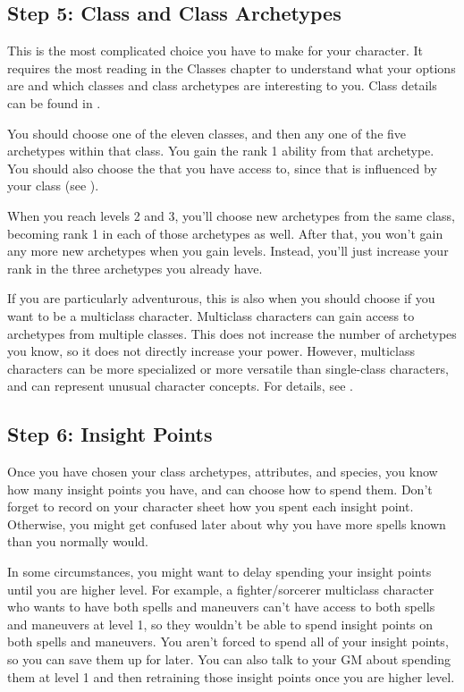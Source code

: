     \subsection{Step 5: Class and Class Archetypes}
        This is the most complicated choice you have to make for your character.
        It requires the most reading in the Classes chapter to understand what your options are and which classes and class archetypes are interesting to you.
        Class details can be found in .

        You should choose one of the eleven classes, and then any one of the five archetypes within that class.
        You gain the rank 1 ability from that archetype.
        You should also choose the  that you have access to, since that is influenced by your class (see ).

        When you reach levels 2 and 3, you'll choose new archetypes from the same class, becoming rank 1 in each of those archetypes as well.
        After that, you won't gain any more new archetypes when you gain levels.
        Instead, you'll just increase your rank in the three archetypes you already have.

        If you are particularly adventurous, this is also when you should choose if you want to be a multiclass character.
        Multiclass characters can gain access to archetypes from multiple classes.
        This does not increase the number of archetypes you know, so it does not directly increase your power.
        However, multiclass characters can be more specialized or more versatile than single-class characters, and can represent unusual character concepts.
        For details, see .

    \subsection{Step 6: Insight Points}
        Once you have chosen your class archetypes, attributes, and species, you know how many insight points you have, and can choose how to spend them.
        Don't forget to record on your character sheet how you spent each insight point.
        Otherwise, you might get confused later about why you have more spells known than you normally would.

        In some circumstances, you might want to delay spending your insight points until you are higher level.
        For example, a fighter/sorcerer multiclass character who wants to have both spells and maneuvers can't have access to both spells and maneuvers at level 1, so they wouldn't be able to spend insight points on both spells and maneuvers.
        You aren't forced to spend all of your insight points, so you can save them up for later.
        You can also talk to your GM about spending them at level 1 and then retraining those insight points once you are higher level.

